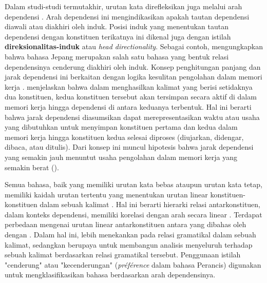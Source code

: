 Dalam studi-studi termutakhir, urutan kata direfleksikan juga melalui arah dependensi \citep{hudson2007language}. Arah dependensi ini mengindikasikan apakah tautan dependensi diawali atau diakhiri oleh induk. Posisi induk yang menentukan tautan dependensi dengan konstituen terikatnya ini dikenal juga dengan istilah \textbf{\gls{direksionalitas-induk}} atau \textit{head directionality}. Sebagai contoh, \cite{hudson2003psychological} mengungkapkan bahwa bahasa Jepang merupakan salah satu bahasa yang bentuk relasi dependensinya cenderung diakhiri oleh induk. Konsep penghitungan panjang dan jarak dependensi ini berkaitan dengan logika kesulitan pengolahan dalam memori kerja \citep{hudson2007language}. \cite{hudson2007language} menjelaskan bahwa dalam menghasilkan kalimat yang berisi setidaknya dua konstituen, kedua konstituen tersebut akan tersimpan secara aktif di dalam memori kerja hingga dependensi di antara keduanya terbentuk. Hal ini berarti bahwa jarak dependensi diasumsikan dapat merepresentasikan waktu atau usaha yang dibutuhkan untuk menyimpan konstituen pertama dan kedua dalam memori kerja hingga konstituen kedua selesai diproses (diujarkan, didengar, dibaca, atau ditulis). Dari konsep ini muncul hipotesis bahwa jarak dependensi yang semakin jauh menuntut usaha pengolahan dalam memori kerja yang semakin berat (\citealp{hudson2007language, gibson1998linguistic}).

Semua bahasa, baik yang memiliki urutan kata bebas ataupun urutan kata tetap, memiliki kaidah urutan tertentu yang menentukan urutan linear konstituen-konstituen dalam sebuah kalimat \citep{tesniere1959elements}. Hal ini berarti hierarki relasi antarkonstituen, dalam konteks dependensi, memiliki korelasi dengan arah secara linear \citep{greenberg1963some}. Terdapat perbedaan mengenai urutan linear antarkonstituen antara yang dibahas oleh \cite{tesniere1959elements} dengan \cite{greenberg1963some}. Dalam hal ini, \cite{greenberg1963some} lebih menekankan pada relasi gramatikal dalam sebuah kalimat, sedangkan \cite{tesniere1959elements} berupaya untuk membangun analisis menyeluruh terhadap sebuah kalimat berdasarkan relasi gramatikal tersebut. Penggunaan istilah "cenderung" atau "kecenderungan" (\textit{pr{\'e}f{\'e}rence} dalam bahasa Perancis) digunakan \cite{tesniere1959elements} untuk mengklasifikasikan bahasa berdasarkan arah dependensinya.


